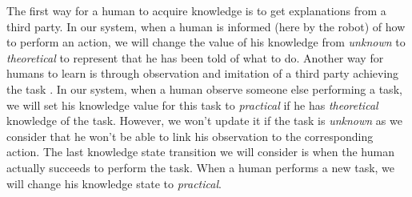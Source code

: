 \documentclass{llncs}
\begin{document}
The first way for a human to acquire knowledge is to get explanations from a third party. In our system, when a human is informed (here by the robot) of how to perform an action, we will change the value of his knowledge from \textit{unknown} to \textit{theoretical} to represent that he has been told of what to do.
%
%
Another way for humans to learn is through observation and imitation of a third party achieving the task \cite{carpenter2005}. 
In our system, when a human observe someone else performing a task, we will set his knowledge value for this task to \textit{practical} if he has \textit{theoretical} knowledge of the task. However, we won't update it if the task is \textit{unknown} as we consider that he won't be able to link his observation to the corresponding action. 
%
%
%
%
%
%
%
%
%
%
The last knowledge state transition we will consider is when the human actually succeeds to perform the task. When a human performs a new task, we will change his knowledge state to \textit{practical}.
\end{document}
